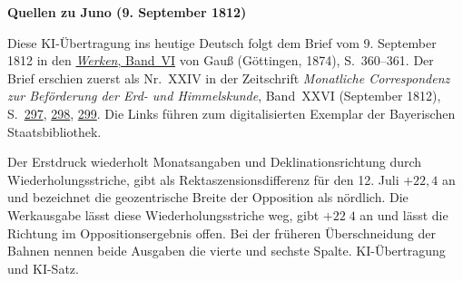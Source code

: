 \clearpage\thispagestyle{empty}
\begin{center}\textbf{Quellen zu Juno (9. September 1812)}\end{center}
\noindent Diese KI-Übertragung ins heutige Deutsch folgt dem Brief vom 9. September 1812 in den \href{https://gdz.sub.uni-goettingen.de/id/PPN236007467}{\textit{Werken}, Band~VI} von Gauß (Göttingen, 1874), S.~360--361. Der Brief erschien zuerst als Nr.~XXIV in der Zeitschrift \textit{Monatliche Correspondenz zur Beförderung der Erd- und Himmelskunde}, Band~XXVI (September 1812), S.~\href{https://api.digitale-sammlungen.de/iiif/image/v2/bsb10538615_00307/full/1600,/0/default.jpg}{297}, \href{https://api.digitale-sammlungen.de/iiif/image/v2/bsb10538615_00308/full/1600,/0/default.jpg}{298}, \href{https://api.digitale-sammlungen.de/iiif/image/v2/bsb10538615_00309/full/1600,/0/default.jpg}{299}. Die Links führen zum digitalisierten Exemplar der Bayerischen Staatsbibliothek.
\par\smallskip\noindent Der Erstdruck wiederholt Monatsangaben und Deklinationsrichtung durch Wiederholungsstriche, gibt als Rektaszensionsdifferenz für den 12. Juli $+22{,}4$ an und bezeichnet die geozentrische Breite der Opposition als nördlich. Die Werkausgabe lässt diese Wiederholungsstriche weg, gibt $+22\;4$ an und lässt die Richtung im Oppositionsergebnis offen. Bei der früheren Überschneidung der Bahnen nennen beide Ausgaben die vierte und sechste Spalte. KI-Übertragung und KI-Satz.
\clearpage
